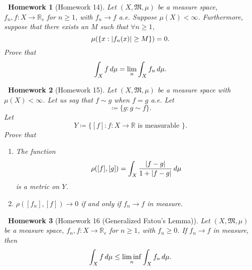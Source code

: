 \documentclass[notoc,notitlepage]{tufte-book}
\newtheorem*{homework}{\faCogs\ Homework}
\begin{document}
\begin{homework}[Homework 14]\label{homework:14}
  Let $(X, \mathfrak{M}, \mu)$ be a measure space,
  $f_n, f : X \to \mathbb{R}_e$ for $n \geq 1$,
  with $f_n \to f$ a.e.
  Suppose $\mu(X) < \infty$.
  Furthermore, suppose that there exists an $M$ such that $\forall n \geq 1$,
  \begin{equation*}
    \mu(\{ x : \left|f_n(x)\right| \geq M \}) = 0.
  \end{equation*}
  Prove that
  \begin{equation*}
    \int_X f \mathop{}\!d{\mu} = \lim_n \int_X f_n \mathop{}\!d{\mu}.
  \end{equation*}
\end{homework}

\begin{homework}[Homework 15]\label{homework:15}
  Let $(X, \mathfrak{M}, \mu)$ be a measure space with $\mu(X) < \infty$.
  Let us say that $f \sim g$ when $f = g$ a.e.
  Let
  \begin{equation*}
    [f] \coloneqq \{ g : g \sim f \}.
  \end{equation*}
  Let
  \begin{equation*}
    Y \coloneqq \{ [f] : f : X \to \mathbb{R} \text{ is measurable } \}.
  \end{equation*}
  Prove that
  \begin{enumerate}
    \item The function
      \begin{equation*}
        \rho([f], [g]) = \int_X \frac{\left|f - g\right|}{1 + \left|f - g\right|} \mathop{}\!d{\mu}
      \end{equation*}
      is a metric on $Y$.

    \item $\rho([f_n], [f]) \to 0$ if and only if
      $f_n \to f$ in measure.
  \end{enumerate}
\end{homework}

\begin{homework}[Homework 16 (Generalized Fatou's Lemma)]\label{homework:16}
  Let $(X, \mathfrak{M}, \mu)$ be a measure space,
  $f_n, f : X \to \mathbb{R}_e$ for $n \geq 1$,
  with $f_n \geq 0$.
  If $f_n \to f$ in measure, then
  \begin{equation*}
    \int_X f \mathop{}\!d{\mu} \leq \liminf_n \int_X f_n \mathop{}\!d{\mu}.
  \end{equation*}
\end{homework}
\end{document}
